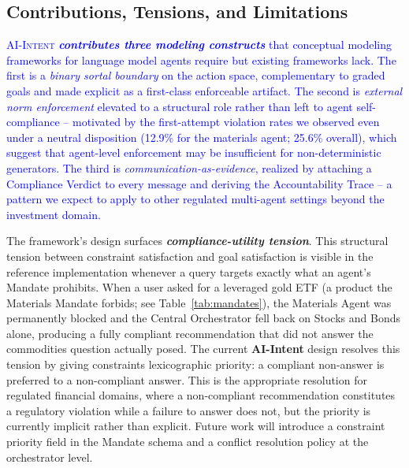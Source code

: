 \documentclass[runningheads]{llncs}
\begin{document}
\subsection {Contributions, Tensions, and Limitations}
\textcolor{blue}{\textsc{AI-Intent} \textbf{\textit{contributes three modeling constructs}} that conceptual modeling frameworks for language model agents require but existing frameworks lack. The first is a \emph{binary sortal boundary} on the action space, complementary to graded goals and made explicit as a first-class enforceable artifact. The second is \emph{external norm enforcement} elevated to a structural role rather than left to agent self-compliance -- motivated by the first-attempt violation rates we observed even under a neutral disposition (12.9\% for the materials agent; 25.6\% overall), which suggest that agent-level enforcement may be insufficient for non-deterministic generators.
The third is \emph{communication-as-evidence}, realized by attaching a Compliance Verdict to every message and deriving the Accountability Trace -- a pattern we expect to apply to other regulated multi-agent settings beyond the investment domain.}

The framework's design surfaces \textbf{\textit{compliance-utility tension}}. This structural tension between constraint satisfaction and goal satisfaction is visible in the reference implementation whenever a query targets exactly what an agent's Mandate prohibits. When a user asked for a leveraged gold ETF (a product the Materials Mandate forbids; see Table~\ref{tab:mandates}), the Materials Agent was permanently blocked and the Central Orchestrator fell back on Stocks and Bonds alone, producing a fully compliant recommendation that did not answer the commodities question actually posed.
The current \textbf{AI-Intent} design resolves this tension by giving constraints lexicographic priority: a compliant non-answer is preferred to a non-compliant answer. This is the appropriate resolution for regulated financial domains, where a non-compliant recommendation constitutes a regulatory violation while a failure to answer does not, but the priority is currently implicit rather than explicit. Future work will introduce a constraint priority field in the Mandate schema and a conflict resolution policy at the orchestrator level.
\end{document}
